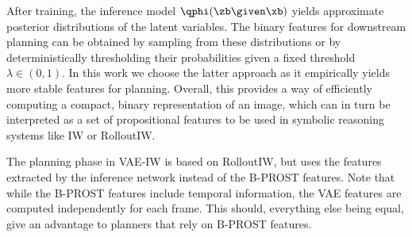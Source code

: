 After training, the inference model $\qphi(\zb \given \xb)$ yields approximate posterior distributions of the latent variables. The binary features for downstream planning can be obtained by sampling from these distributions or by deterministically thresholding their probabilities given a fixed threshold $\lambda \in (0, 1)$.
In this work we choose the latter approach as it empirically yields more stable features for planning.
Overall, this provides a way of efficiently computing a compact, binary representation of an image, which can in turn be interpreted as a set of propositional features to be used in symbolic reasoning systems like IW or RolloutIW. 

The planning phase in VAE-IW is based on RolloutIW, but uses the features extracted by the inference network instead of the B-PROST features. Note that while the B-PROST features include temporal information, the VAE features are computed independently for each frame. This should, everything else being equal, give an advantage to planners that rely on B-PROST features.
